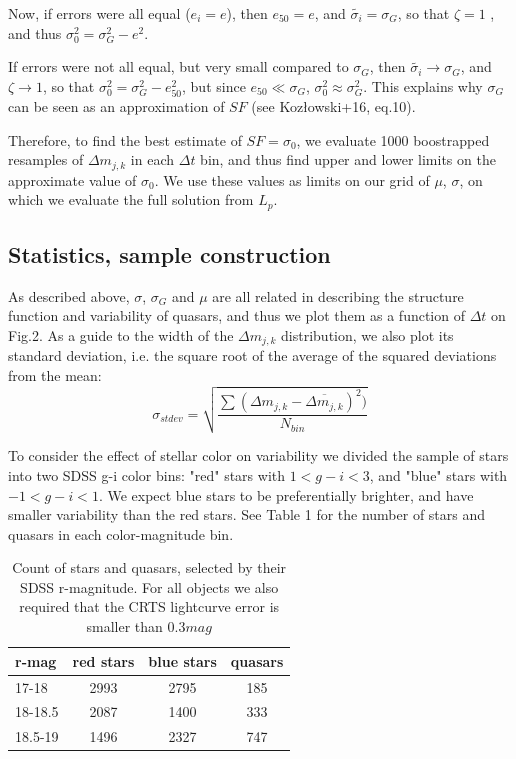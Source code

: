\documentclass[fleqn,usenatbib]{mnras}  %
\begin{document}
Now, if errors were all equal ($e_{i} = e$), then $e_{50} = e$, and $\tilde{\sigma_{i}}= \sigma_{G}$, so that $\zeta=1$ , and thus $\sigma_{0}^{2} = \sigma_{G}^{2} - e^{2}$. 

If errors were not all equal, but very small compared to $\sigma_{G}$, then $\tilde{\sigma_{i}} \to \sigma_{G}$, and $\zeta \to 1$, so that  $\sigma_{0}^{2} = \sigma_{G}^{2} - e_{50}^{2}$, but since $e_{50} \ll \sigma_{G}$,  $\sigma_{0}^{2} \approx \sigma_{G}^{2}$. This explains why $\sigma_{G}$ can be seen as an approximation of $SF$ (see Koz\l{}owski+16, eq.10). 

Therefore, to find the best estimate of $SF = \sigma_{0}$, we evaluate 1000 boostrapped resamples of $\Delta m_{j,k}$ in each $\Delta t$ bin, and thus find upper and lower limits on the approximate value of $\sigma_{0}$. We use these values as limits on our grid  of  $\mu$, $\sigma$, on which we evaluate the full solution from  $L_{p}$. 


\subsection{Statistics, sample construction}
\label{sec:stats}
As described above, $\sigma$, $\sigma_{G}$ and $\mu$ are all related in describing the structure function and variability of quasars, and thus we plot them as a function of $\Delta t$ on Fig.2. As a guide to the width of the $\Delta m_{j,k}$ distribution, we also plot its standard deviation, i.e. the square root of the average of the squared deviations from the mean:
\begin{equation}
\sigma_{stdev} = \sqrt{\frac{\sum(\Delta m_{j,k} - \overline{\Delta m_{j,k}})^{2})}{ N_{bin}}}
\end{equation}

To consider the effect of stellar color on variability we divided the sample of stars into two SDSS g-i color bins: "red" stars with $1<g-i<3$, and  "blue" stars with $-1<g-i<1$. We expect blue stars to be preferentially brighter, and have smaller variability than the red stars. See Table 1 for the number of stars and quasars in each color-magnitude bin. 

\begin{table}

\caption{Count of stars and quasars, selected by their SDSS r-magnitude. For all objects we also required that the CRTS lightcurve error is smaller than $0.3 mag$}
\label{tab:object_count}
\begin{tabular}{ l|ccc } 
r-mag  & red stars & blue stars & quasars \\ 
 \hline
17-18   & 2993 & 2795   & 185    \\ 
18-18.5 & 2087 &  1400  & 333   \\ 
18.5-19 & 1496 &  2327  & 747   
\end{tabular}
\end{table}
 
\end{document}
